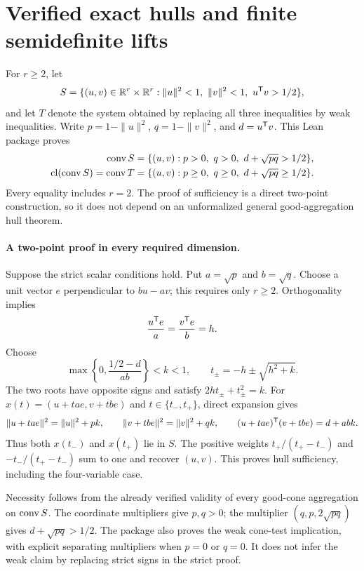 \section{Verified exact hulls and finite semidefinite lifts}
\label{sec:formal-exact-hull}

For $r\geq2$, let
\[
 S=\{(u,v)\in\mathbb R^r\times\mathbb R^r:
 \|u\|^2<1,\ \|v\|^2<1,\ u^{\mathsf T} v>1/2\},
\]
and let $T$ denote the system obtained by replacing all three inequalities
by weak inequalities. Write $p=1-\|u\|^2$, $q=1-\|v\|^2$, and
$d=u^{\mathsf T} v$. This Lean package proves
\begin{align*}
 \operatorname{conv} S&=\{(u,v):p>0,\ q>0,\ d+\sqrt{pq}>1/2\},\\
 \operatorname{cl}(\operatorname{conv} S)=\operatorname{conv} T
 &=\{(u,v):p\geq0,\ q\geq0,\ d+\sqrt{pq}\geq1/2\}.
\end{align*}
Every equality includes $r=2$. The proof of sufficiency is a direct
two-point construction, so it does not depend on an unformalized general
good-aggregation hull theorem.

\paragraph{A two-point proof in every required dimension.}
Suppose the strict scalar conditions hold. Put $a=\sqrt p$ and $b=\sqrt q$.
Choose a unit vector $e$ perpendicular to $bu-av$; this requires only
$r\geq2$. Orthogonality implies
\[
 \frac{u^{\mathsf T} e}{a}=\frac{v^{\mathsf T} e}{b}=h.
\]
Choose
\[
 \max\left\{0,\frac{1/2-d}{ab}\right\}<k<1,
 \qquad t_\pm=-h\pm\sqrt{h^2+k}.
\]
The two roots have opposite signs and satisfy $2ht_\pm+t_\pm^2=k$.
For $x(t)=(u+tae,v+tbe)$ and $t\in\{t_-,t_+\}$, direct expansion gives
\[
 \|u+tae\|^2=\|u\|^2+pk,\qquad
 \|v+tbe\|^2=\|v\|^2+qk,\qquad
 (u+tae)^{\mathsf T}(v+tbe)=d+abk.
\]
Thus both $x(t_-)$ and $x(t_+)$ lie in $S$. The positive weights
$t_+/(t_+-t_-)$ and $-t_-/(t_+-t_-)$ sum to one and recover $(u,v)$.
This proves hull sufficiency, including the four-variable case.

Necessity follows from the already verified validity of every good-cone
aggregation on $\operatorname{conv} S$. The coordinate multipliers give $p,q>0$;
the multiplier $(q,p,2\sqrt{pq})$ gives $d+\sqrt{pq}>1/2$.
The package also proves the weak cone-test implication, with explicit
separating multipliers when $p=0$ or $q=0$. It does not infer the weak
claim by replacing strict signs in the strict proof.

